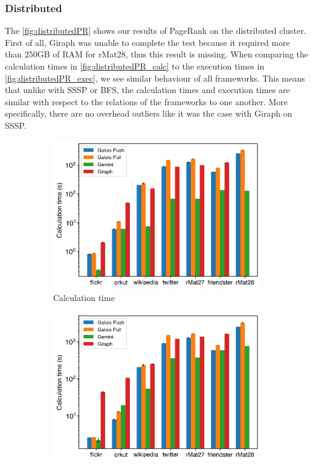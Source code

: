 \subsubsection{Distributed}
The \autoref{fig:distributedPR} shows our results of PageRank on the distributed cluster.
First of all, Giraph was unable to complete the test because it required more than 250GB of RAM for rMat28, thus this result is missing.
When comparing the calculation times in \autoref{fig:distributedPR_calc} to the execution times in \autoref{fig:distributedPR_exec}, we see similar behaviour of all frameworks. This means that unlike with SSSP or BFS, the calculation times and execution times are similar with respect to the relations of the frameworks to one another. More specifically, there are no overhead outliers like it was the case with Giraph on SSSP.
\begin{figure}
	\hfil
	\begin{subfigure}{0.32\textwidth}
		\includegraphics[width=\linewidth]{../../plots/distributedPR_calcTime.png}
		\caption{Calculation time}
		\label{fig:distributedPR_calc}
	\end{subfigure}
	\hfil
	\begin{subfigure}{0.32\textwidth}
		\includegraphics[width=\linewidth]{../../plots/distributedPR_execTime.png}

\end{subfigure}
\end{figure}
